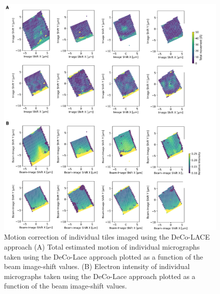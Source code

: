\documentclass[
]{article}
\newenvironment{fignos:tagged-figure}[1][]{
    \let\oldthefigure\thefigure
    \let\oldtheHfigure\theHfigure
    \renewcommand{\thefigure}{#1}
    \renewcommand{\theHfigure}{#1}
  }{
    \let\thefigure\oldthefigure
    \let\theHfigure\oldtheHfigure
    \addtocounter{figure}{-1}
  }
\begin{document}
\begin{fignos:tagged-figure}

\begin{figure}
\hypertarget{fig:lamella_motion_thickness}{%
\centering
\includegraphics{figures/lamella_motion_thickness.png}
\caption{Motion correction of individual tiles imaged using the DeCo-LACE approach
(A) Total estimated motion of individual micrographs taken using the DeCo-Lace approach
plotted as a function of the beam image-shift values.
(B) Electron intensity of individual micrographs taken using the DeCo-Lace approach
plotted as a function of the beam image-shift values.}\label{fig:lamella_motion_thickness}
}
\end{figure}

\end{fignos:tagged-figure}
\end{document}
